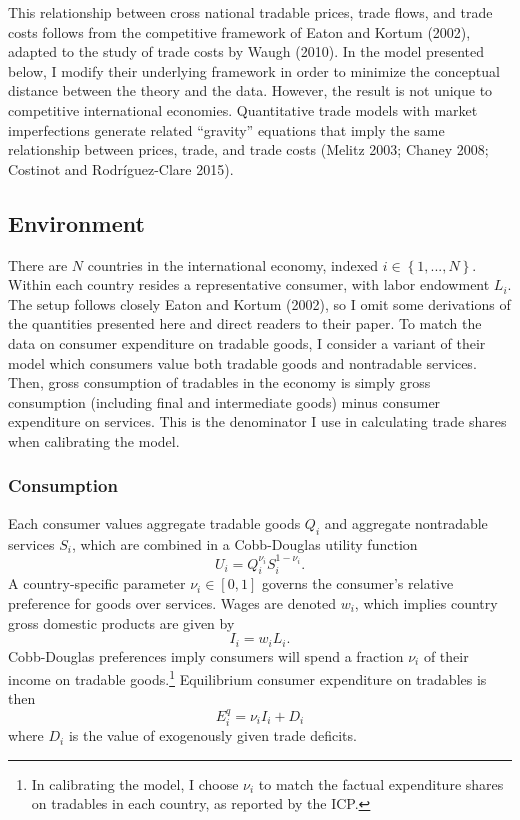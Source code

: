 \documentclass{puthesis}
\begin{document}
This relationship between cross national tradable prices, trade flows,
and trade costs follows from the competitive framework of Eaton and
Kortum (2002), adapted to the study of trade costs by Waugh (2010). In
the model presented below, I modify their underlying framework in order
to minimize the conceptual distance between the theory and the data.
However, the result is not unique to competitive international
economies. Quantitative trade models with market imperfections generate
related ``gravity'' equations that imply the same relationship between
prices, trade, and trade costs (Melitz 2003; Chaney 2008; Costinot and
Rodríguez-Clare 2015).

\subsection{Environment}

There are \(N\) countries in the international economy, indexed
\(i \in \left\{ 1, ..., N \right\}\). Within each country resides a
representative consumer, with labor endowment \(L_i\). The setup follows
closely Eaton and Kortum (2002), so I omit some derivations of the
quantities presented here and direct readers to their paper. To match
the data on consumer expenditure on tradable goods, I consider a variant
of their model which consumers value both tradable goods and nontradable
services. Then, gross consumption of tradables in the economy is simply
gross consumption (including final and intermediate goods) minus
consumer expenditure on services. This is the denominator I use in
calculating trade shares when calibrating the model.

\subsubsection{Consumption}

Each consumer values aggregate tradable goods \(Q_i\) and aggregate
nontradable services \(S_i\), which are combined in a Cobb-Douglas
utility function \begin{equation} \label{eq:CD}
U_i = Q_i^{\nu_i} S_i^{1 - \nu_i} .
\end{equation} A country-specific parameter \(\nu_i \in [0,1]\) governs
the consumer's relative preference for goods over services. Wages are
denoted \(w_i\), which implies country gross domestic products are given
by \[
I_i = w_i L_i .
\] Cobb-Douglas preferences imply consumers will spend a fraction
\(\nu_i\) of their income on tradable goods.\footnote{In calibrating the
  model, I choose \(\nu_i\) to match the factual expenditure shares on
  tradables in each country, as reported by the ICP.} Equilibrium
consumer expenditure on tradables is then \[
E_i^q = \nu_i I_i + D_i
\] where \(D_i\) is the value of exogenously given trade deficits.
\end{document}
